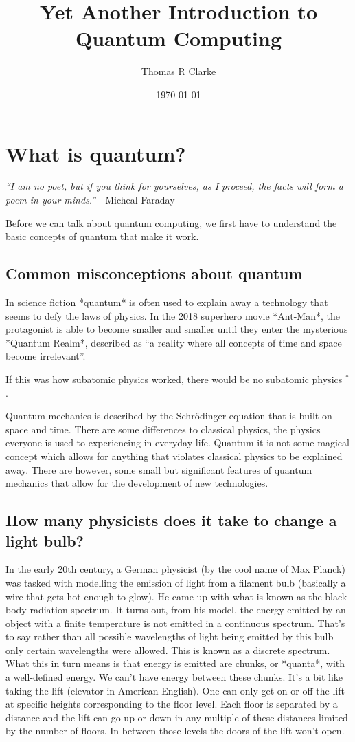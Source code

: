 \documentclass{book}
\title{Yet Another Introduction to Quantum Computing}
\author{Thomas R Clarke}
\date{\today}
\begin{document}
\maketitle
\tableofcontents

\chapter{What is quantum?}

\textit{“I am no poet, but if you think for yourselves, as I proceed, the facts will form a poem in your minds.”} - Micheal Faraday

Before we can talk about quantum computing, we first have to understand the basic concepts of quantum that make it work. 

\section{Common misconceptions about quantum}
 
In science fiction *quantum* is often used to explain away a technology that seems to defy the laws of physics. In the 2018 superhero movie *Ant-Man*, the protagonist is able to become smaller and smaller until they enter the mysterious *Quantum Realm*, described as “a reality where all concepts of time and space become irrelevant”. 

If this was how subatomic physics worked, there would be no subatomic physics $^*$.

Quantum mechanics is described by the Schrödinger equation that is built on space and time. There are some differences to classical physics, the physics everyone is used to experiencing in everyday life. Quantum it is not some magical concept which allows for anything that violates classical physics to be explained away. There are however, some small but significant features of quantum mechanics that allow for the development of new technologies. 


\section{How many physicists does it take to change a light bulb?}

In the early 20th century, a German physicist (by the cool name of Max Planck) was tasked with modelling the emission of light from a filament bulb (basically a wire that gets hot enough to glow). He came up with what is known as the black body radiation spectrum. It turns out, from his model, the energy emitted by an object with a finite temperature is not emitted in a continuous spectrum. That's to say rather than all possible wavelengths of light being emitted by this bulb only certain wavelengths were allowed. This is known as a discrete spectrum. What this in turn means is that energy is emitted are chunks, or *quanta*, with a well-defined energy. We can't have energy between these chunks. It's a bit like taking the lift (elevator in American English). One can only get on or off the lift at specific heights corresponding to the floor level. Each floor is separated by a distance and the lift can go up or down in any multiple of these distances limited by the number of floors. In between those levels the doors of the lift won't open.
\end{document}
